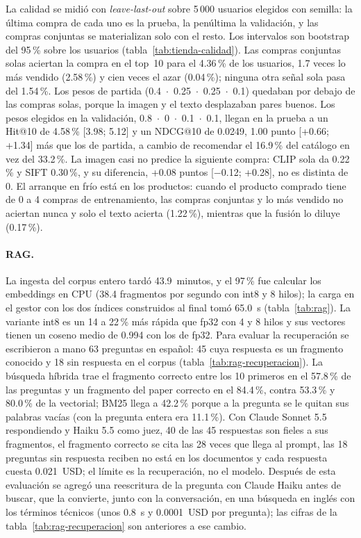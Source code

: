 La calidad se midió con \emph{leave-last-out} sobre 5\,000 usuarios elegidos con semilla: la
última compra de cada uno es la prueba, la penúltima la validación, y las compras conjuntas
se materializan solo con el resto. Los intervalos son bootstrap del 95\,\% sobre los usuarios
(tabla~\ref{tab:tienda-calidad}). Las compras conjuntas solas aciertan la compra en el top~10
para el 4.36\,\% de los usuarios, 1.7 veces lo más vendido (2.58\,\%) y cien veces el azar
(0.04\,\%); ninguna otra señal sola pasa del 1.54\,\%. Los pesos de partida
(0.4~$\cdot$~0.25~$\cdot$~0.25~$\cdot$~0.1) quedaban por debajo de las compras solas, porque
la imagen y el texto desplazaban pares buenos. Los pesos elegidos en la validación,
0.8~$\cdot$~0~$\cdot$~0.1~$\cdot$~0.1, llegan en la prueba a un Hit@10 de 4.58\,\% [3.98;
5.12] y un NDCG@10 de 0.0249, 1.00 punto [+0.66; +1.34] más que los de partida, a cambio de
recomendar el 16.9\,\% del catálogo en vez del 33.2\,\%. La imagen casi no predice la
siguiente compra: CLIP sola da
0.22\,\% y SIFT 0.30\,\%, y su diferencia, +0.08 puntos [$-$0.12; +0.28], no es distinta de 0.
El arranque en frío está en los productos: cuando el producto comprado tiene de 0 a 4 compras
de entrenamiento, las compras conjuntas y lo más vendido no aciertan nunca y solo el texto
acierta (1.22\,\%), mientras que la fusión lo diluye (0.17\,\%).

\paragraph{RAG.} La ingesta del corpus entero tardó 43.9~minutos, y el 97\,\% fue calcular
los embeddings en CPU (38.4 fragmentos por segundo con int8 y 8 hilos); la carga en el
gestor con los dos índices construidos al final tomó 65.0~s (tabla~\ref{tab:rag}). La
variante int8 es un 14 a 22\,\% más rápida que fp32 con 4 y 8 hilos y sus vectores tienen un
coseno medio de 0.994 con los de fp32. Para evaluar la recuperación se escribieron a mano
63 preguntas en español: 45 cuya respuesta es un fragmento conocido y 18 sin respuesta en el
corpus (tabla~\ref{tab:rag-recuperacion}). La búsqueda híbrida trae el fragmento correcto
entre los 10 primeros en el 57.8\,\% de las preguntas y un fragmento del paper correcto en el
84.4\,\%, contra 53.3\,\% y 80.0\,\% de la vectorial; BM25 llega a 42.2\,\% porque a la
pregunta se le quitan sus palabras vacías (con la pregunta entera era 11.1\,\%). Con Claude Sonnet 5.5
respondiendo y Haiku 5.5 como juez, 40 de las 45 respuestas son fieles a sus fragmentos, el
fragmento correcto se cita las 28 veces que llega al prompt, las 18 preguntas sin respuesta
reciben \guillemotleft{}no está en los documentos\guillemotright{} y cada respuesta cuesta
0.021~USD; el límite es la recuperación, no el modelo. Después de esta evaluación se agregó
una reescritura de la pregunta con Claude Haiku antes de buscar, que la convierte, junto con la
conversación, en una búsqueda en inglés con los términos técnicos (unos 0.8~s y 0.0001~USD por
pregunta); las cifras de la tabla~\ref{tab:rag-recuperacion} son anteriores a ese cambio.



